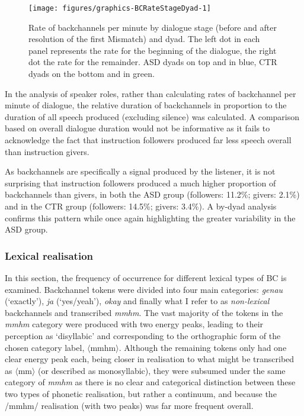 \begin{figure}

{\texttt{[image: figures/graphics-BCRateStageDyad-1]}
	
}

\caption{Rate of backchannels per minute by dialogue stage (before and after resolution of the first Mismatch) and dyad. The left dot in each panel represents the rate for the beginning of the dialogue, the right dot the rate for the remainder. ASD dyads on top and in blue, CTR dyads on the bottom and in green.}\label{fig:BCRateStageDyad}
\end{figure}

\label{BCFP_BC_results_BCRate_Role}

In the analysis of speaker roles, rather than calculating rates of backchannel per minute of dialogue, the relative duration of backchannels in proportion to the duration of all speech produced (excluding silence) was calculated. A comparison based on overall dialogue duration would not be informative as it fails to acknowledge the fact that instruction followers produced far less speech overall than instruction givers.

As backchannels are specifically a signal produced by the listener, it is not surprising that instruction followers produced a much higher proportion of backchannels than givers, in both the ASD group (followers: 11.2\%; givers: 2.1\%) and in the CTR group (followers: 14.5\%; givers: 3.4\%). A by-dyad analysis confirms this pattern while once again highlighting the greater variability in the ASD group.


\subsubsection{Lexical realisation}\label{BCFP_BC_results_BCType}


In this section, the frequency of occurrence for different lexical types of BC is examined. Backchannel tokens were divided into four main categories: \emph{genau} (`exactly'), \emph{ja} (`yes/yeah'), \emph{okay} and finally what I refer to as \textit{non-lexical} backchannels and transcribed \emph{mmhm}. The vast majority of the tokens in the \emph{mmhm} category were produced with two energy peaks, leading to their perception as ‘disyllabic’ and corresponding to the orthographic form of the chosen category label, \(\langle\)mmhm\(\rangle\). Although the remaining tokens only had one clear energy peak each, being closer in realisation to what might be transcribed as \(\langle\)mm\(\rangle\) (or described as monosyllabic), they were subsumed under the same category of \emph{mmhm} as there is no clear and categorical distinction between these two types of phonetic realisation, but rather a continuum, and because the /mmhm/ realisation (with two peaks) was far more frequent overall.


